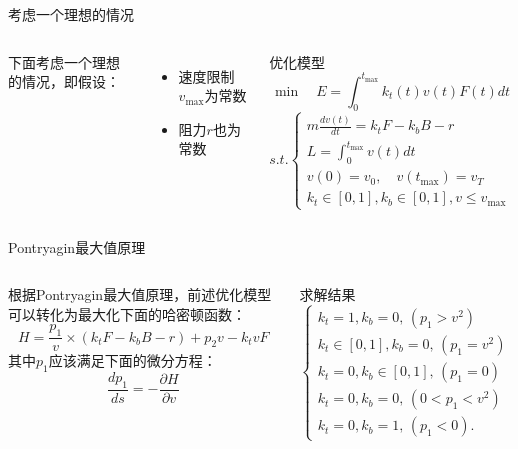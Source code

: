 \documentclass{beamer}
\begin{document}
\begin{frame}{考虑一个理想的情况}
\begin{columns}[c]
    \column{5cm}
        下面考虑一个理想的情况，即假设：
        \begin{itemize}
          \item 速度限制$v_{\max}$为常数
          \item 阻力$r$也为常数
        \end{itemize}
    \column{6cm}
    \begin{block}{优化模型}
        \begin{equation*}
          \min \quad E = \int_0^{t_{\max}} k_t(t) v(t) F(t) dt
        \end{equation*}
        \begin{equation*}
          s.t. \left\{
          \begin{array}{l}
            m \frac{dv(t)}{dt} = k_t F - k_b B - r \\
            L = \int_0^{t_{\max}} v(t) dt \\
            v(0) = v_0, \quad v(t_{\max}) = v_T \\
            k_t \in [0, 1], k_b \in [0,1], v \leq v_{\max}
          \end{array}
          \right.
        \end{equation*}
    \end{block}
\end{columns}
\end{frame}

\begin{frame}{Pontryagin最大值原理}
\begin{columns}[c]
    \column{6.5cm}
        根据Pontryagin最大值原理，前述优化模型可以转化为最大化下面的哈密顿函数：
        \begin{equation*}
          H = \frac{p_1}{v} \times (k_t F - k_b B - r) + p_2 v - k_t v F
        \end{equation*}
        其中$p_1$应该满足下面的微分方程：
        \begin{equation*}
          \frac{dp_1}{ds} = - \frac{\partial H}{\partial v}
        \end{equation*}
    \column{5.5cm}
    \begin{block}{求解结果}
    \begin{equation*}
      \left\{
        \begin{array}{l}
        k_t = 1, k_b = 0, \, (p_1>v^2) \\
        k_t \in [0,1], k_b = 0, \, (p_1 = v^2) \\
        k_t = 0, k_b \in [0,1], \, (p_1 = 0) \\
        k_t = 0, k_b = 0, \, (0 < p_1 < v^2) \\
        k_t = 0, k_b = 1, \, (p_1 < 0).
        \end{array}
      \right.
    \end{equation*}
    \end{block}
\end{columns}
\end{frame}
\end{document}
